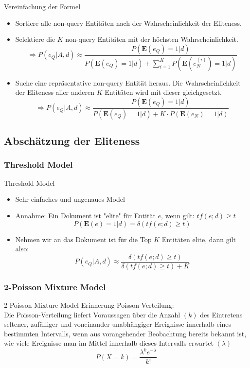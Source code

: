 \documentclass{beamer}
\begin{document}
\begin{frame}{Vereinfachung der Formel}
\begin{itemize}
\item Sortiere alle non-query Entitäten nach der Wahrscheinlichkeit der Eliteness.
\item Selektiere die $K$ non-query Entitäten mit der höchsten Wahrscheinlichkeit.
\[ \Rightarrow P(e_Q|A,d) \approx \frac{P(\textbf{E}(e_Q)=1|d)}{P(\textbf{E}(e_Q)=1|d) + \sum_{i=1}^{K}P(\textbf{E}(e_N^{(i)})=1|d)} \]
\item Suche eine repräsentative non-query Entität heraus. Die Wahrscheinlichkeit der Eliteness aller anderen $K$ Entitäten wird mit dieser gleichgesetzt.
\[ \Rightarrow P(e_Q|A,d) \approx \frac{P(\textbf{E}(e_Q)=1|d)}{P(\textbf{E}(e_Q)=1|d) + K \cdot P(\textbf{E}(e_N)=1|d)} \]
\end{itemize}
\end{frame}

\subsection{Abschätzung der Eliteness}
\subsubsection{Threshold Model}

\begin{frame}{Threshold Model}
\begin{itemize}
\item Sehr einfaches und ungenaues Model
\item Annahme: Ein Dokument ist "elite" für Entität $e$, wenn gilt: $tf(e;d) \geq t$
\[ P(\textbf{E}(e)=1|d) = \delta (tf(e;d) \geq t)\]
\item Nehmen wir an das Dokument ist für die Top $K$ Entitäten elite, dann gilt also:
\[ P(e_Q|A,d) \approx \frac{\delta (tf(e;d) \geq t)}{ \delta (tf(e;d) \geq t) + K} \]
\end{itemize}
\end{frame}

\subsubsection{2-Poisson Mixture Model}

\begin{frame}{2-Poisson Mixture Model}
Erinnerung Poisson Verteilung:\\
Die Poisson-Verteilung liefert Voraussagen über die Anzahl $(k)$ des Eintretens seltener, zufälliger und voneinander unabhängiger Ereignisse innerhalb eines bestimmten Intervalls, wenn aus vorangehender Beobachtung bereits bekannt ist, wie viele Ereignisse man im Mittel innerhalb dieses Intervalls erwartet $(\lambda)$
\[P(X=k)=\frac{\lambda^k e^{-\lambda}}{k!}\]

\end{frame}
\end{document}
